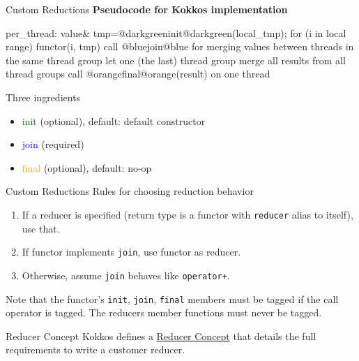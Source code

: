\begin{frame}[fragile]{Custom Reductions}
\textbf{Pseudocode for Kokkos implementation}
\begin{code}[keywords={parallel_reduce,custom}]
per_thread:
  value& tmp=@darkgreeninit@darkgreen(local_tmp);
  for (i in local range)
    functor(i, tmp)
call @bluejoin@blue for merging values between threads
  in the same thread group
let one (the last) thread group merge all results
  from all thread groups
call @orangefinal@orange(result) on one thread 
\end{code}

Three ingredients
\begin{itemize}
\item \textcolor{darkgreen}{init} (optional), default: default constructor
\item \textcolor{blue}{join} (required)
\item \textcolor{orange}{final} (optional), default: no-op
\end{itemize}

\end{frame}

\begin{frame}[fragile]{Custom Reductions}
Rules for choosing reduction behavior
\begin{enumerate}
\item If a reducer is specified (return type is a functor with \texttt{reducer} alias to itself), use that.
\item If functor implements \texttt{join}, use functor as reducer.
\item Otherwise, assume \texttt{join} behaves like \texttt{operator+}.
\end{enumerate}

Note that the functor's \texttt{init}, \texttt{join}, \texttt{final} members must be tagged if the call operator is tagged. The reducers member functions must never be tagged.\\

\begin{block}{Reducer Concept}
  Kokkos defines a \href{https://kokkos.org/kokkos-core-wiki/API/core/builtinreducers/ReducerConcept.html}{Reducer Concept} that details the full requirements to write a customer reducer.
\end{block}
\end{frame}

